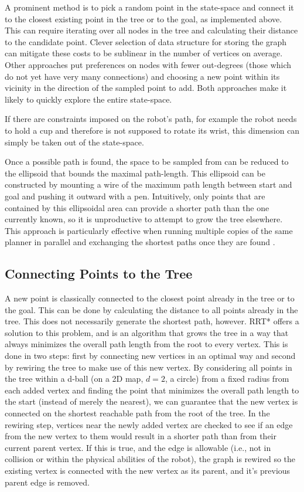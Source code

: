 A prominent method is to pick a random point in the state-space and connect it to the closest existing point in the tree or to the goal, as implemented above. This can require iterating over all nodes in the tree and calculating their distance to the candidate point. Clever selection of data structure for storing the graph can mitigate these costs to be sublinear in the number of vertices on average. Other approaches put preferences on nodes with fewer out-degrees (those which do not yet have very many connections) and choosing a new point within its vicinity in the direction of the sampled point to add. Both approaches make it likely to quickly explore the entire state-space.

If there are constraints imposed on the robot's path, for example the robot needs to hold a cup and therefore is not supposed to rotate its wrist, this dimension can simply be taken out of the state-space.

Once a possible path is found, the space to be sampled from can be reduced to the ellipsoid that bounds the maximal path-length. This ellipsoid can be constructed by mounting a wire of the maximum path length between start and goal and pushing it outward with a pen. Intuitively, only points that are contained by this ellipsoidal area can provide a shorter path than the one currently known, so it is unproductive to attempt to grow the tree elsewhere. This approach is particularly effective when running multiple copies of the same planner in parallel and exchanging the shortest paths once they are found \cite{otte2012}.

\subsection{Connecting Points to the Tree}
A new point is classically connected to the closest point already in the tree or to the goal. This can be done by calculating the distance to all points already in the tree. This does not necessarily generate the shortest path, however. RRT* offers a solution to this problem, and is an algorithm that grows the tree in a way that always minimizes the overall path length from the root to every vertex. This is done in two steps: first by connecting new vertices in an optimal way and second by rewiring the tree to make use of this new vertex. By considering all points in the tree within a d-ball (on a 2D map, $d=2$, a circle) from a fixed radius from each added vertex and finding the point that minimizes the overall path length to the start (instead of merely the nearest), we can guarantee that the new vertex is connected on the shortest reachable path from the root of the tree. In the rewiring step, vertices near the newly added vertex are checked to see if an edge from the new vertex to them would result in a shorter path than from their current parent vertex. If this is true, and the edge is allowable (i.e., not in collision or within the physical abilities of the robot), the graph is rewired so the existing vertex is connected with the new vertex as its parent, and it's previous parent edge is removed.

